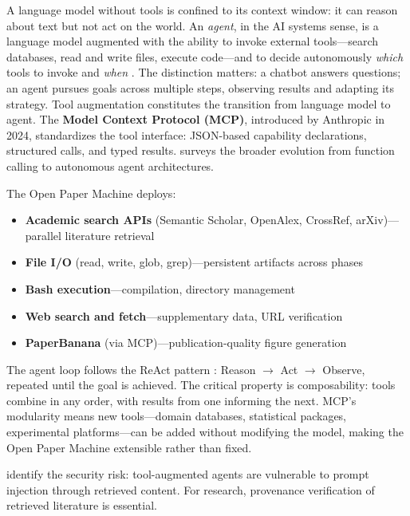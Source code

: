 \documentclass{article}
\begin{document}
A language model without tools is confined to its context window: it can reason about text but not act on the world. An \textit{agent}, in the AI systems sense, is a language model augmented with the ability to invoke external tools---search databases, read and write files, execute code---and to decide autonomously \textit{which} tools to invoke and \textit{when} \citep{wang2024survey,handler2023taxonomy}. The distinction matters: a chatbot answers questions; an agent pursues goals across multiple steps, observing results and adapting its strategy. Tool augmentation constitutes the transition from language model to agent. The \textbf{Model Context Protocol (MCP)}, introduced by Anthropic in 2024, standardizes the tool interface: JSON-based capability declarations, structured calls, and typed results. \citet{viswanathan2026tooluse} surveys the broader evolution from function calling to autonomous agent architectures.

The Open Paper Machine deploys:

\begin{itemize}
  \item \textbf{Academic search APIs} (Semantic Scholar, OpenAlex, CrossRef, arXiv)---parallel literature retrieval
  \item \textbf{File I/O} (read, write, glob, grep)---persistent artifacts across phases
  \item \textbf{Bash execution}---compilation, directory management
  \item \textbf{Web search and fetch}---supplementary data, URL verification
  \item \textbf{PaperBanana} (via MCP)---publication-quality figure generation
\end{itemize}

The agent loop follows the ReAct pattern \citep{yao2022react}: Reason $\rightarrow$ Act $\rightarrow$ Observe, repeated until the goal is achieved. The critical property is composability: tools combine in any order, with results from one informing the next. MCP's modularity means new tools---domain databases, statistical packages, experimental platforms---can be added without modifying the model, making the Open Paper Machine extensible rather than fixed.

\citet{greshake2023prompt} identify the security risk: tool-augmented agents are vulnerable to prompt injection through retrieved content. For research, provenance verification of retrieved literature is essential.
\end{document}
